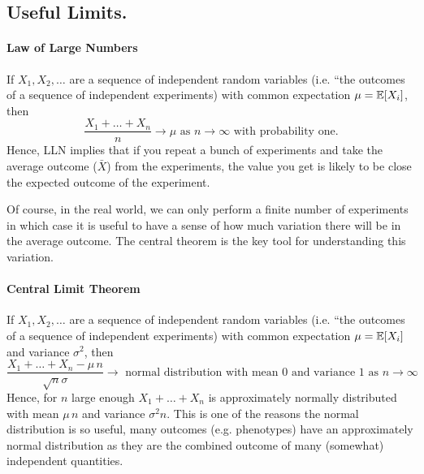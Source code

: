 \subsection*{Useful Limits.} \label{section:useful_limits}
\paragraph{Law of Large Numbers} If $X_1,X_2,\dots$ are a sequence of independent random variables (i.e. ``the outcomes of a sequence of independent experiments) with common expectation $\mu= \mathbb{E}[X_i]$, then 
\begin{equation}
\frac{X_1+\dots +X_n}{n} \to \mu \mbox{ as }n\to \infty \mbox{ with
  probability one.}
\end{equation}
Hence, LLN implies that if you repeat a bunch of experiments and take
the average outcome ($\bar{X}$) from the experiments, the value you get is likely to be close the expected outcome of the experiment. 

Of course, in the real world, we can only perform a finite number of experiments in which case it is useful to have a sense of how much variation there will be in the average outcome. The central theorem is the key tool for understanding this variation. 

\paragraph{Central Limit Theorem} If $X_1,X_2,\dots$ are a sequence of
independent random variables (i.e. ``the outcomes of a sequence of
independent experiments) with common expectation $\mu= \mathbb{E}[X_i]$ and 
variance $\sigma^2$, then 
\begin{equation}
\frac{X_1+\dots +X_n-\mu \,n }{\sqrt{n}\sigma} \to \mbox{ normal distribution with mean $0$ and variance $1$ as $n\to \infty$ }
\end{equation}
Hence, for $n$ large enough 
$
X_1+\dots+X_n 
$
is approximately normally distributed with mean $\mu\,n$ and variance
$\sigma^2 n$. This is one of the reasons the normal distribution is so
useful, many outcomes (e.g. phenotypes) have an approximately normal distribution as
they are the combined outcome of many (somewhat) independent quantities.  